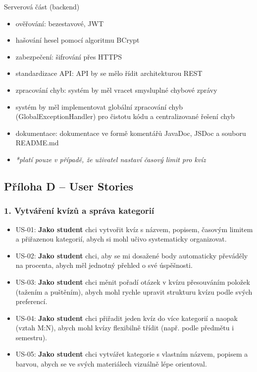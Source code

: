 \documentclass{vskpou} %
\begin{document}
Serverová část (backend)
\begin{itemize}
    \item ověřování: bezestavové, JWT
    \item hašování hesel pomocí algoritmu BCrypt
    \item zabezpečení: šifrování přes HTTPS
    \item standardizace API: API by se mělo řídit architekturou REST
    \item zpracování chyb: systém by měl vracet smysluplné chybové zprávy
    \item systém by měl implementovat globální zpracování chyb (GlobalExceptionHandler) pro čistotu kódu a centralizované řešení chyb
    \item dokumentace: dokumentace ve formě komentářů JavaDoc, JSDoc a souboru README.md
\end{itemize}
\begin{itemize}
    \item \textit{*platí pouze v případě, že uživatel nastaví časový limit pro kvíz}
\end{itemize}

\clearpage
\subsection{Příloha D -- User Stories}

\subsubsection*{1. Vytváření kvízů a správa kategorií}
\begin{itemize}
    \item US-01: \textbf{Jako student} chci vytvořit kvíz s názvem, popisem, časovým limitem a přiřazenou kategorií, abych si mohl učivo systematicky organizovat.
    \item US-02: \textbf{Jako student} chci, aby se mi dosažené body automaticky převáděly na procenta, abych měl jednotný přehled o své úspěšnosti.
    \item US-03: \textbf{Jako student} chci měnit pořadí otázek v kvízu přesouváním položek (tažením a puštěním), abych mohl rychle upravit strukturu kvízu podle svých preferencí.
    \item US-04: \textbf{Jako student} chci přiřadit jeden kvíz do více kategorií a naopak (vztah M:N), abych mohl kvízy flexibilně třídit (např. podle předmětu i semestru).
    \item US-05: \textbf{Jako student} chci vytvářet kategorie s vlastním názvem, popisem a barvou, abych se ve svých materiálech vizuálně lépe orientoval.
\end{itemize}
\end{document}

